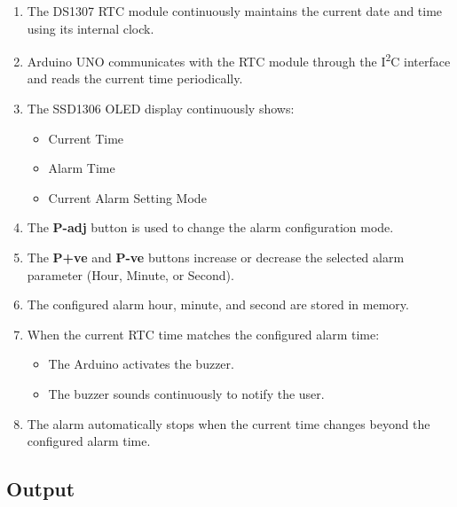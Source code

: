 \begin{enumerate}

\item The DS1307 RTC module continuously maintains the current date and time using its internal clock.

\item Arduino UNO communicates with the RTC module through the I\textsuperscript{2}C interface and reads the current time periodically.

\item The SSD1306 OLED display continuously shows:
\begin{itemize}
    \item Current Time
    \item Alarm Time
    \item Current Alarm Setting Mode
\end{itemize}

\item The \textbf{P-adj} button is used to change the alarm configuration mode.

\item The \textbf{P+ve} and \textbf{P-ve} buttons increase or decrease the selected alarm parameter (Hour, Minute, or Second).

\item The configured alarm hour, minute, and second are stored in memory.

\item When the current RTC time matches the configured alarm time:

\begin{itemize}
    \item The Arduino activates the buzzer.
    \item The buzzer sounds continuously to notify the user.
\end{itemize}

\item The alarm automatically stops when the current time changes beyond the configured alarm time.

\end{enumerate}


\subsection{Output}

